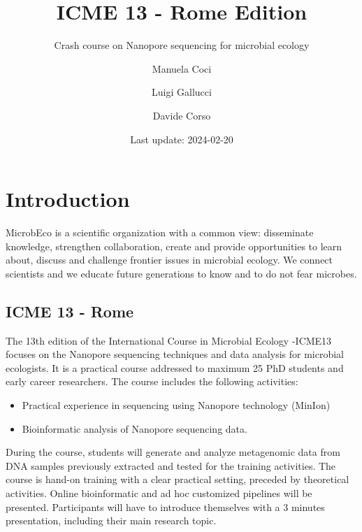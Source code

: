 \documentclass[
]{book}
\title{ICME 13 - Rome Edition}
\subtitle{Crash course on Nanopore sequencing for microbial ecology}
\author{Manuela Coci \and Luigi Gallucci \and Davide Corso}
\date{Last update: 2024-02-20}
\providecommand{\tightlist}{%
  \setlength{\itemsep}{0pt}\setlength{\parskip}{0pt}}
\begin{document}
\maketitle

{
\setcounter{tocdepth}{1}
\tableofcontents
}
\chapter{Introduction}\label{introduction}

MicrobEco is a scientific organization with a common view: disseminate knowledge, strengthen collaboration, create and provide opportunities to learn about, discuss and challenge frontier issues in microbial ecology. We connect scientists and we educate future generations to know and to do not fear microbes.

\section{ICME 13 - Rome}\label{icme-13---rome}

The 13th edition of the International Course in Microbial Ecology -ICME13 focuses on the Nanopore sequencing techniques and data analysis for microbial ecologists. It is a practical course addressed to maximum 25 PhD students and early career researchers. The course includes the following activities:

\begin{itemize}
\tightlist
\item
  Practical experience in sequencing using Nanopore technology (MinIon)
\item
  Bioinformatic analysis of Nanopore sequencing data.
\end{itemize}

During the course, students will generate and analyze metagenomic data from DNA samples previously extracted and tested for the training activities. The course is hand-on training with a clear practical setting, preceded by theoretical activities. Online bioinformatic and ad hoc customized pipelines will be presented. Participants will have to introduce themselves with a 3 minutes presentation, including their main research topic.
\end{document}
